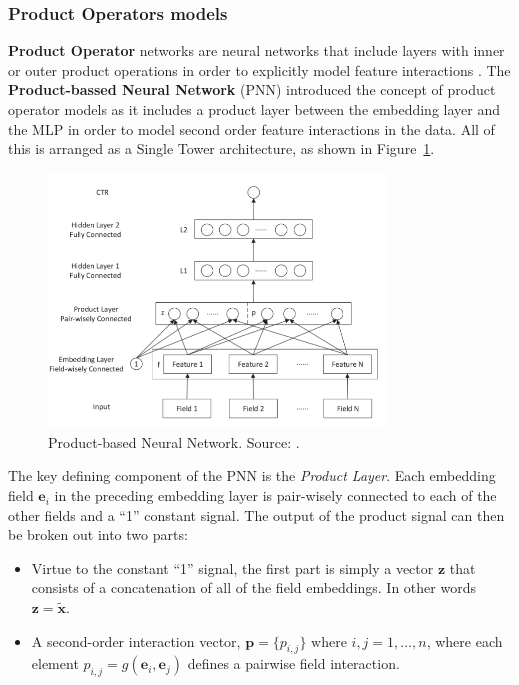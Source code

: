 \documentclass{mldsmsc}
\begin{document}
\subsubsection{Product Operators models}

\textbf{Product Operator} networks are neural networks that include layers with inner or outer
product operations in order to explicitly model feature interactions \citep{RefWorks:zhang2021deep}.
The \textbf{Product-bassed Neural Network} (PNN) introduced the concept of product operator models
as it includes a product layer between the embedding layer and the MLP in order to model second
order feature interactions in the data. All of this is arranged as a Single Tower architecture, as shown
in Figure~\ref{fig:pnn}.

\begin{figure}[h]
    \centering
    \includegraphics[width=0.8\textwidth]{../figures/pnn.png}
    \caption{Product-based Neural Network. Source: \citep{RefWorks:qu2016product-based}.}
    \label{fig:pnn}
\end{figure}

The key defining component of the PNN is the \emph{Product Layer}. Each embedding field $\mathbf{e}_i$
in the preceding embedding layer is pair-wisely connected to each of the other fields and a ``1''
constant signal. The output of the product signal can then be broken out into two parts:

\begin{itemize}
    \item Virtue to the constant ``1'' signal, the first part is simply a vector $\mathbf{z}$ that consists of a concatenation
    of all of the field embeddings. In other words $\mathbf{z} = \tilde{\mathbf{x}}$.
    \item A second-order interaction vector, $\mathbf{p} = \{p_{i,j}\}\text{ where } i,j = 1, \ldots, n$, where each element
    $p_{i,j} = g(\mathbf{e}_i, \mathbf{e}_j)$ defines a pairwise field interaction.
\end{itemize}
\end{document}
